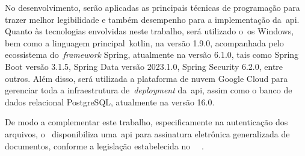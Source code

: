 No desenvolvimento, serão aplicadas as principais técnicas de programação para
trazer melhor legibilidade e também desempenho para a implementação
da~\acrfull{api}.
Quanto às tecnologias envolvidas neste trabalho, será utilizado o~\acrfull{os}
Windows, bem como a linguagem principal~\acrfull{kotlin}, na versão 1.9.0,
acompanhada pelo ecossistema do~\textit{framework} Spring, atualmente na versão
6.1.0, tais como Spring Boot versão 3.1.5, Spring Data versão 2023.1.0, Spring
Security 6.2.0, entre outros.
Além disso, será utilizada a plataforma de nuvem Google Cloud para gerenciar
toda a infraestrutura de~\textit{deployment} da~\acrshort{api}, assim como o
banco de dados relacional PostgreSQL, atualmente na versão 16.0.

De modo a complementar este trabalho, especificamente na autenticação dos
arquivos,
o~\citeauthor*{govbr2020} disponibiliza uma~\acrshort{api} para assinatura
eletrônica
generalizada de documentos, conforme a legislação estabelecida no
~~\cite{govbr2020}.